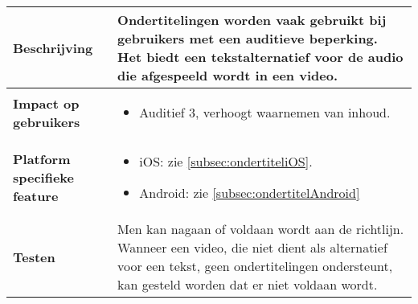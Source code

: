 \begin{table}[H]
\begin{tabular}{|l|p{12cm}|}
        \hline
        \textbf{Beschrijving}                & Ondertitelingen worden vaak gebruikt bij gebruikers met een auditieve beperking. Het biedt een tekstalternatief voor de audio die afgespeeld wordt in een video. \\ 
        \hline
        \textbf{Impact op gebruikers}        & 
        \begin{itemize}
            \item Auditief 3, verhoogt waarnemen van inhoud.             
        \end{itemize}                                                                                                                   \\ 
      \hline
    \textbf{Platform specifieke feature} & \begin{itemize}
        \item iOS: zie \ref{subsec:ondertiteliOS}.
        \item Android: zie \ref{subsec:ondertitelAndroid}
    \end{itemize}                                                                                                                                                                       \\ 
        \hline
        \textbf{Testen}                      & Men kan nagaan of voldaan wordt aan de richtlijn. Wanneer een video, die niet dient als alternatief voor een tekst, geen ondertitelingen ondersteunt, kan gesteld worden dat er niet voldaan wordt.                                                                                                                                                                                              \\
        \hline
    \end{tabular}
\end{table}






